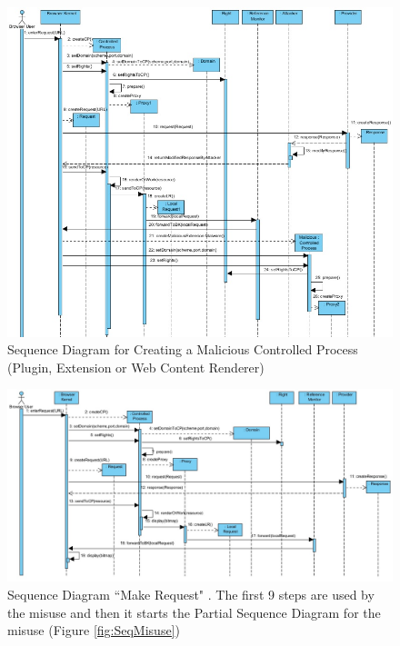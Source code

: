 \documentclass{sig-alternate-05-2015}
\begin{document}
\begin{figure}[h!t]
  \centering
  \includegraphics[scale=0.8]{figures/misuse/MakeRequestMisuse_installMalicious.jpg}
  \caption{Sequence Diagram for Creating a Malicious Controlled Process (Plugin, Extension or Web Content Renderer)}
  \label{fig:SeqInstall}
\end{figure}

\begin{figure}[h!t]
  \centering
  \includegraphics[scale=0.53]{figures/MakeRequest_v8.jpg}
  \caption{Sequence Diagram ``Make Request" \cite{silva2015}. The first 9 steps are used by the misuse and then it starts the Partial Sequence Diagram for the misuse (Figure \ref{fig:SeqMisuse})}
  \label{fig:SeqMakeReq}
\end{figure}
\end{document}
